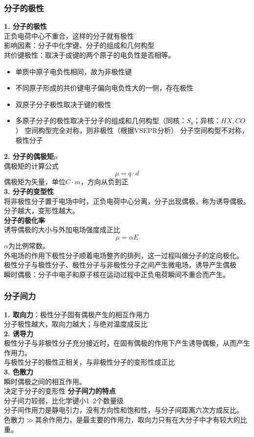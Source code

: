 \documentclass[utf8,a4paper,12pt]{ctexart}
\begin{document}
\subsubsection{分子的极性}
{\bf 1. 分子的极性}\\
正负电荷中心不重合，这样的分子就有极性\\
影响因素：分子中化学键、分子的组成和几何构型\\
共价键极性：取决于成键的两个原子的电负性是否相等。
\begin{itemize}
\item 单质中原子电负性相同，故为非极性键
\item 不同原子形成的共价键电子偏向电负性大的一侧，存在极性
\item 双原子分子极性取决于键的极性
\item 多原子分子的极性取决于分子的组成和几何构型（同核：$S_8$；异核：$HX,CO$）
	\subitem 空间构型完全对称，则非极性（根据VSEPR分析）
	\subitem 分子空间构型不对称，极性分子
\end{itemize}
{\bf 2. 分子的偶极矩$\mu$}\\
偶极矩的计算公式
\begin{equation}
\mu = q \cdot d
\end{equation}
偶极矩为矢量，单位$C\cdot m$，方向从负到正\\
{\bf 3. 分子的变型性}\\
将非极性分子置于电场中时，正负电荷中心分离，分子出现偶极，称为诱导偶极。分子越大，变形性越大。\\
{\bf 分子的极化率}\\
诱导偶极的大小与外加电场强度成正比
\[\mu = \alpha E\]
$\alpha$为比例常数。\\
外电场的作用下极性分子顺着电场整齐的排列，这一过程叫做分子的定向极化。\\
极性分子与极性分子、极性分子与非极性分子之间产生微电场，诱导产生偶极\\
瞬时偶极：分子中电子和原子核在运动过程中正负电荷瞬间不重合而产生。\\
\subsubsection{分子间力}
{\bf 1. 取向力}：极性分子固有偶极产生的相互作用力\\
分子极性越大，取向力越大；与绝对温度成反比\\
{\bf 2. 诱导力}\\
极性分子与非极性分子充分接近时，在固有偶极的作用下产生诱导偶极，从而产生作用力。\\
与极性分子的极性正相关，与非极性分子的变形性成正比\\
{\bf 3. 色散力}\\
瞬时偶极之间的相互作用。\\
决定于分子的变形性
{\bf 分子间力的特点}\\
分子间力较弱，比化学键小1~2个数量级\\
分子间作用力是静电引力，没有方向性和饱和性，与分子间距离六次方成反比。\\
色散力$\gg$其余作用力，是最主要的作用力，取向力只有在大分子中才有较大的比重。\\
\end{document}
